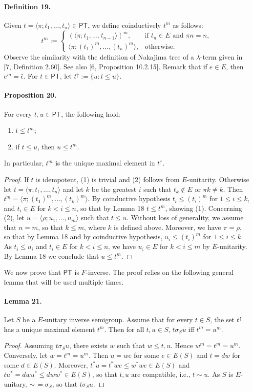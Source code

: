 \documentclass[10pt,a4paper]{amsart}
\begin{document}
\paragraph{Definition 19.} Given $t=\langle\pi;t_1,\ldots,t_n\rangle\in\mathsf{PT}$, we define coinductively $t^m$ as follows:
\[
t^m:=\begin{cases}
(\langle\pi;t_1,\ldots,t_{n-1}\rangle)^m,&\text{if }t_n\in E\text{ and }\pi n=n,\\
\langle\pi;(t_1)^m,\ldots,(t_n)^m\rangle,&\text{otherwise.}
\end{cases}
\]
Observe the similarity with the definition of Nakajima tree of a $\lambda$-term given in [7, Definition 2.60]. See also [6, Proposition 10.2.15].
Remark that if $e\in E$, then $e^m=\bar\epsilon$.
For $t\in\mathsf{PT}$, let $t^{\uparrow}:=\{u:t\le u\}$.
\paragraph{Proposition 20.} For every $t,u\in\mathsf{PT}$, the following hold:
\begin{enumerate}\item $t\le t^m$;\item if $t\le u$, then $u\le t^m$.\end{enumerate}
In particular, $t^m$ is the unique maximal element in $t^{\uparrow}$.
\begin{proof}
If $t$ is idempotent, (1) is trivial and (2) follows from $E$-unitarity.
Otherwise let $t=\langle\pi;t_1,\ldots,t_n\rangle$ and let $k$ be the greatest $i$ such that $t_k\notin E$ or $\pi k\ne k$.
Then $t^m=\langle\pi;(t_1)^m,\ldots,(t_k)^m\rangle$.
By coinductive hypothesis $t_i\le(t_i)^m$ for $1\le i\le k$, and $t_i\in E$ for $k<i\le n$, so that by Lemma 18 $t\le t^m$, showing (1).
Concerning (2), let $u=\langle\rho;u_1,\ldots,u_m\rangle$ such that $t\le u$.
Without loss of generality, we assume that $n=m$, so that $k\le m$, where $k$ is defined above.
Moreover, we have $\pi=\rho$, so that by Lemma 18 and by coinductive hypothesis, $u_i\le(t_i)^m$ for $1\le i\le k$.
As $t_i\le u_i$ and $t_i\in E$ for $k<i\le n$, we have $u_i\in E$ for $k<i\le m$ by $E$-unitarity.
By Lemma 18 we conclude that $u\le t^m$.
\end{proof}
We now prove that $\mathsf{PT}$ is $F$-inverse. The proof relies on the following general lemma that will be used multiple times.
\paragraph{Lemma 21.} Let $S$ be a $E$-unitary inverse semigroup. Assume that for every $t\in S$, the set $t^{\uparrow}$ has a unique maximal element $t^m$.
Then for all $t,u\in S$, $t\mathrel{\sigma_S}u$ iff $t^m=u^m$.
\begin{proof}
Assuming $t\mathrel{\sigma_S}u$, there exists $w$ such that $w\le t,u$. Hence $w^m=t^m=u^m$.
Conversely, let $w=t^m=u^m$. Then $u=we$ for some $e\in E(S)$ and $t=dw$ for some $d\in E(S)$.
Moreover, $t^*u=t^*we\le w^*we\in E(S)$ and $tu^*=dwu^*\le dww^*\in E(S)$, so that $t,u$ are compatible, i.e., $t\sim u$.
As $S$ is $E$-unitary, $\sim\,=\sigma_S$, so that $t\mathrel{\sigma_S}u$.
\end{proof}
\end{document}
